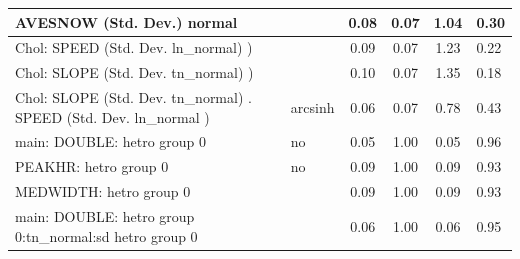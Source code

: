 \begin{table}
\begin{center}
\begin{tabular}{|l|l|c|c|c|l|}
			\hline
			AVESNOW (Std. Dev.) normal &  & 0.08 & 0.07 & 1.04 & 0.30 \\
			\hline
			 Chol: SPEED (Std. Dev. ln_normal) ) &  & 0.09 & 0.07 & 1.23 & 0.22 \\
			\hline
			 Chol: SLOPE (Std. Dev. tn_normal) ) &  & 0.10 & 0.07 & 1.35 & 0.18 \\
			\hline
			 Chol: SLOPE (Std. Dev. tn_normal) . SPEED (Std. Dev.   ln_normal ) & arcsinh & 0.06 & 0.07 & 0.78 & 0.43 \\
			\hline
			main: DOUBLE: hetro group 0 & no & 0.05 & 1.00 & 0.05 & 0.96 \\
			\hline
			PEAKHR: hetro group 0 & no & 0.09 & 1.00 & 0.09 & 0.93 \\
			\hline
			MEDWIDTH: hetro group 0 &  & 0.09 & 1.00 & 0.09 & 0.93 \\
			\hline
			main: DOUBLE: hetro group 0:tn_normal:sd  hetro group 0 &  & 0.06 & 1.00 & 0.06 & 0.95 \\
			\hline
		\end{tabular}
	\end{center}
\end{table}